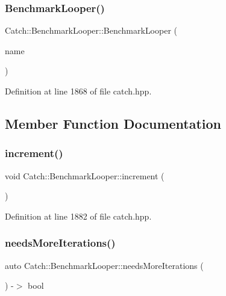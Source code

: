 \subsubsection{\texorpdfstring{Benchmark\+Looper()}{BenchmarkLooper()}}
{\footnotesize\ttfamily Catch\+::\+Benchmark\+Looper\+::\+Benchmark\+Looper (\begin{DoxyParamCaption}\item[{\mbox{\hyperlink{class_catch_1_1_string_ref}{String\+Ref}}}]{name }\end{DoxyParamCaption})\hspace{0.3cm}{\ttfamily [inline]}}



Definition at line 1868 of file catch.\+hpp.



\subsection{Member Function Documentation}
\mbox{\label{class_catch_1_1_benchmark_looper_a210552aff5b19408637444d4bb35d59c}} 
\subsubsection{\texorpdfstring{increment()}{increment()}}
{\footnotesize\ttfamily void Catch\+::\+Benchmark\+Looper\+::increment (\begin{DoxyParamCaption}{ }\end{DoxyParamCaption})\hspace{0.3cm}{\ttfamily [inline]}}



Definition at line 1882 of file catch.\+hpp.

\mbox{\label{class_catch_1_1_benchmark_looper_a97bd944521f519b1593a5d1d2f9998fa}} 
\subsubsection{\texorpdfstring{needs\+More\+Iterations()}{needsMoreIterations()}}
{\footnotesize\ttfamily auto Catch\+::\+Benchmark\+Looper\+::needs\+More\+Iterations (\begin{DoxyParamCaption}{ }\end{DoxyParamCaption}) -\/$>$  bool}

